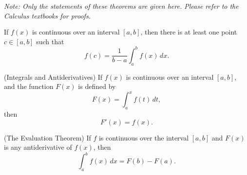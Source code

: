 
\begin{small}
\textit{Note: Only the statements of these theorems are given here. Please refer to the Calculus textbooks for proofs.}
\end{small}

\vspace{0.5em}

\begin{theorem}
If $f(x)$ is continuous over an interval $[a, b]$, then there is at least one point $c \in [a, b]$ such that
\[
f(c) = \frac{1}{b - a} \int_{a}^{b} f(x) \, dx.
\]
\end{theorem}

\begin{theorem}
    (Integrals and Antiderivatives)
If $f(x)$ is continuous over an interval $[a, b]$, and the function $F(x)$ is defined by
\[
F(x) = \int_{a}^{x} f(t) \, dt,
\]
then
\[
F'(x) = f(x).
\]
\end{theorem}

\begin{theorem}
    (The Evaluation Theorem)
If $f$ is continuous over the interval $[a, b]$ and $F(x)$ is any antiderivative of $f(x)$, then
\[
\int_{a}^{b} f(x) \, dx = F(b) - F(a).
\]
\end{theorem}
